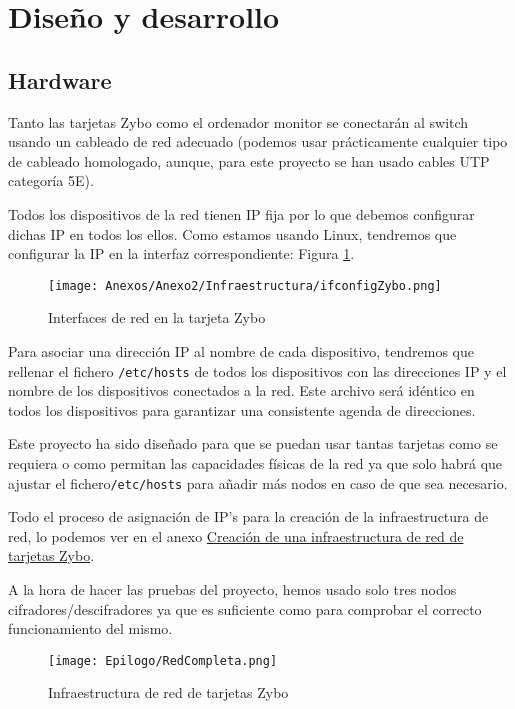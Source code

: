\section{Diseño y desarrollo}
\subsection{Hardware}
Tanto las tarjetas Zybo como el ordenador monitor se conectarán al switch usando un cableado de red adecuado (podemos usar prácticamente cualquier tipo de cableado homologado, aunque, para este proyecto se han usado cables UTP categoría 5E).

Todos los dispositivos de la red tienen IP fija por lo que debemos configurar dichas IP en todos los ellos. Como estamos usando Linux, tendremos que configurar la IP en la interfaz correspondiente: Figura \ref{Interfaces de red en la tarjeta Zybo}.

\begin{figure}[h]
	\centering
	\texttt{[image: Anexos/Anexo2/Infraestructura/ifconfigZybo.png]}
	\caption{Interfaces de red en la tarjeta Zybo}
	\label{Interfaces de red en la tarjeta Zybo}
\end{figure}

Para asociar una dirección IP al nombre de cada dispositivo, tendremos que rellenar el fichero \texttt{/etc/hosts} de todos los dispositivos con las direcciones IP y el nombre de los dispositivos conectados a la red. Este archivo será idéntico en todos los dispositivos para garantizar una consistente agenda de direcciones.

Este proyecto ha sido diseñado para que se puedan usar tantas tarjetas como se requiera o como permitan las capacidades físicas de la red ya que solo habrá que ajustar el fichero\texttt{/etc/hosts} para añadir más nodos en caso de que sea necesario.

Todo el proceso de asignación de IP's para la creación de la infraestructura de red, lo podemos ver en el anexo \hyperlink{CreacionInfraestructura}{Creación de una infraestructura de red de tarjetas Zybo}.

A la hora de hacer las pruebas del proyecto, hemos usado solo tres nodos cifradores/descifradores ya que es suficiente como para comprobar el correcto funcionamiento del mismo.

\begin{figure}[h]
	\centering
	\texttt{[image: Epilogo/RedCompleta.png]}
	\caption{Infraestructura de red de tarjetas Zybo}
	\label{Infraestructura de red de tarjetas Zybo}
\end{figure}

